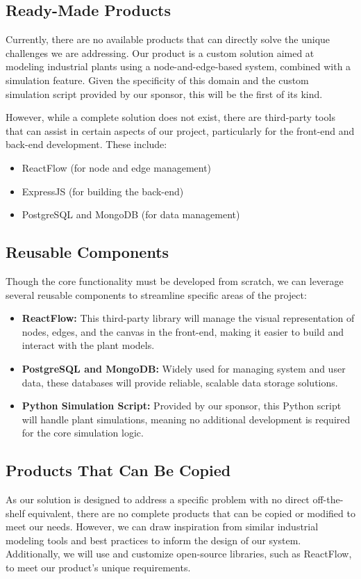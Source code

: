 \documentclass[12pt]{article}
\begin{document}
\subsection{Ready-Made Products}
Currently, there are no available products that can directly solve the unique challenges we are addressing. Our product is a custom solution aimed at modeling industrial plants using a node-and-edge-based system, combined with a simulation feature. Given the specificity of this domain and the custom simulation script provided by our sponsor, this will be the first of its kind.

However, while a complete solution does not exist, there are third-party tools that can assist in certain aspects of our project, particularly for the front-end and back-end development. These include:
\begin{itemize}
    \item ReactFlow (for node and edge management)
    \item ExpressJS (for building the back-end)
    \item PostgreSQL and MongoDB (for data management)
\end{itemize}

\subsection{Reusable Components}
Though the core functionality must be developed from scratch, we can leverage several reusable components to streamline specific areas of the project:
\begin{itemize}
    \item \textbf{ReactFlow:} This third-party library will manage the visual representation of nodes, edges, and the canvas in the front-end, making it easier to build and interact with the plant models.
    \item \textbf{PostgreSQL and MongoDB:} Widely used for managing system and user data, these databases will provide reliable, scalable data storage solutions.
    \item \textbf{Python Simulation Script:} Provided by our sponsor, this Python script will handle plant simulations, meaning no additional development is required for the core simulation logic.
\end{itemize}

\subsection{Products That Can Be Copied}
As our solution is designed to address a specific problem with no direct off-the-shelf equivalent, there are no complete products that can be copied or modified to meet our needs. However, we can draw inspiration from similar industrial modeling tools and best practices to inform the design of our system. Additionally, we will use and customize open-source libraries, such as ReactFlow, to meet our product’s unique requirements.
\end{document}
